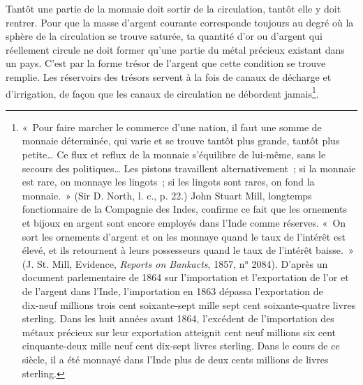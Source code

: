 \documentclass[french,twoside]{book} %
\begin{document}
Tantôt une partie de la monnaie doit sortir de la circulation, tantôt elle y doit rentrer. Pour que la masse d’argent courante corresponde toujours au degré où la sphère de la circulation se trouve saturée, ta quantité d’or ou d’argent qui réellement circule ne doit former qu’une partie du métal précieux existant dans un pays. C’est par la forme trésor de l’argent que cette condition se trouve remplie. Les réservoirs des trésors servent à la fois de canaux de décharge et d’irrigation, de façon que les canaux de circulation ne débordent jamais\footnote{« Pour faire marcher le commerce d’une nation, il faut une somme de monnaie déterminée, qui varie et se trouve tantôt plus grande, tantôt plus petite… Ce flux et reflux de la monnaie s’équilibre de lui‑même, sans le secours des politiques… Les pistons travaillent alternativement ; si la monnaie est rare, on monnaye les lingots ; si les lingots sont rares, on fond la monnaie. » (Sir D. North, l. c., p. 22.) John Stuart Mill, longtemps fonctionnaire de la Compagnie des Indes, confirme ce fait que les ornements et bijoux en argent sont encore employés dans l’Inde comme réserves. « On sort les ornements d’argent et on les monnaye quand le taux de l’intérêt est élevé, et ils retournent à leurs possesseurs quand le taux de l’intérêt baisse. » (J. St. Mill, Evidence, \emph{Reports on Bankacts}, 1857, n° 2084). D’après un document parlementaire de 1864 sur l’importation et l’exportation de l’or et de l’argent dans l’Inde, l’importation en 1863 dépassa l’exportation de dix‑neuf millions trois cent soixante‑sept mille sept cent soixante‑quatre livres sterling. Dans les huit années avant 1864, l’excédent de l’importation des métaux précieux sur leur exportation atteignit cent neuf millions six cent cinquante‑deux mille neuf cent dix‑sept livres sterling. Dans le cours de ce siècle, il a été monnayé dans l’Inde plus de deux cents millions de livres sterling.}.
\end{document}
